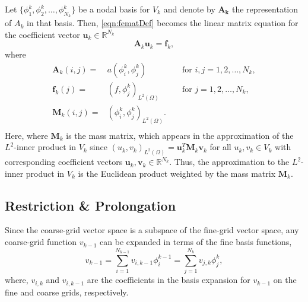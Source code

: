 \documentclass[smallcondensed,final]{svjour3}     %
\begin{document}
Let $\{\phi_1^k,\phi_2^k,\ldots,\phi_{N_k}^k\}$ be a nodal basis for $V_k$ and
denote by $\mathbf{A_k}$ the representation of $A_k$ in that
basis. Then, \eqref{eqn:fematDef} becomes the linear matrix equation
for the coefficient vector $\mathbf{u}_k\in \mathbb{R}^{N_k}$
\begin{equation}
\mathbf{A}_k\mathbf{u}_k = \mathbf{f}_k,
\end{equation}
where
\begin{align*}
\mathbf{A}_{k}(i,j) =& a(\phi_i^k,\phi_j^k)  && \text{ for } i,j = 1,2,\ldots,N_k, \\
\mathbf{f}_{k}(j)   =& (f,\phi_j^k)_{L^2(\Omega)} && \text{ for } j=1,2,\ldots,N_k, \\
\mathbf{M}_k(i,j) =& (\phi_i^k,\phi_j^k)_{L^2(\Omega)}. \\
\end{align*}
Here, where $\mathbf{M}_k$ is the mass matrix, which appears in the
approximation of the $L^2$-inner product in $V_k$ since
$(u_k,v_k)_{L^2(\Omega)} = \mathbf{u}_k^T\mathbf{M}_k\mathbf{v}_k$ for
all $u_k,v_k\in V_k$ with corresponding coefficient vectors
$\mathbf{u}_k,\mathbf{v}_k\in \mathbb{R}^{N_k}$. Thus, the
approximation to the $L^2$-inner product in $V_k$ is the Euclidean
product weighted by the mass matrix $\mathbf{M}_k$.



\subsection{Restriction \& Prolongation} %
\label{sub:restriction_&_prolongation}
Since the coarse-grid vector space is a subspace of the fine-grid
vector space, any coarse-grid function $v_{k-1}$ can be expanded in
terms of the fine basis functions,
\begin{equation} 
  v_{k-1} = \sum_{i=1}^{N_{k-1}} v_{i,k-1}\phi_i^{k-1} = \sum_{j=1}^{N_k} v_{j,k}\phi_j^k, 
\end{equation} 
where, $v_{i,k}$ and $v_{i,k-1}$ are the coefficients in the basis
expansion for $v_{k-1}$ on the fine and coarse grids, respectively.
\end{document}
